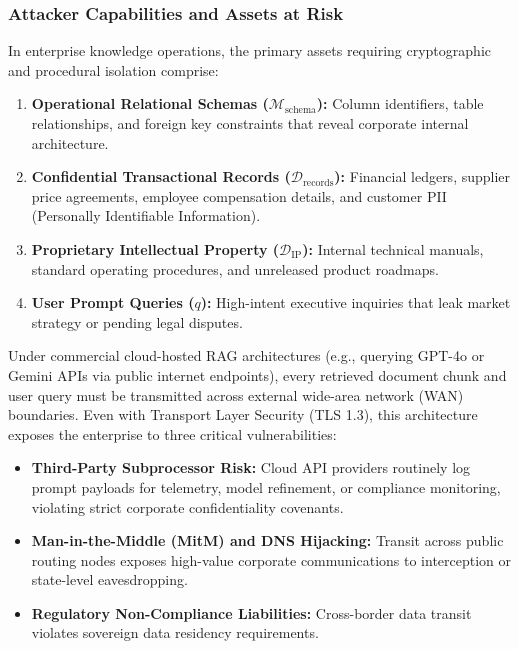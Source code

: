 \subsubsection{Attacker Capabilities and Assets at Risk}
In enterprise knowledge operations, the primary assets requiring cryptographic and procedural isolation comprise:
\begin{enumerate}
    \item \textbf{Operational Relational Schemas ($\mathcal{M}_{\text{schema}}$):} Column identifiers, table relationships, and foreign key constraints that reveal corporate internal architecture.
    \item \textbf{Confidential Transactional Records ($\mathcal{D}_{\text{records}}$):} Financial ledgers, supplier price agreements, employee compensation details, and customer PII (Personally Identifiable Information).
    \item \textbf{Proprietary Intellectual Property ($\mathcal{D}_{\text{IP}}$):} Internal technical manuals, standard operating procedures, and unreleased product roadmaps.
    \item \textbf{User Prompt Queries ($q$):} High-intent executive inquiries that leak market strategy or pending legal disputes.
\end{enumerate}

Under commercial cloud-hosted RAG architectures (e.g., querying GPT-4o or Gemini APIs via public internet endpoints), every retrieved document chunk and user query must be transmitted across external wide-area network (WAN) boundaries. Even with Transport Layer Security (TLS 1.3), this architecture exposes the enterprise to three critical vulnerabilities:
\begin{itemize}
    \item \textbf{Third-Party Subprocessor Risk:} Cloud API providers routinely log prompt payloads for telemetry, model refinement, or compliance monitoring, violating strict corporate confidentiality covenants.
    \item \textbf{Man-in-the-Middle (MitM) and DNS Hijacking:} Transit across public routing nodes exposes high-value corporate communications to interception or state-level eavesdropping.
    \item \textbf{Regulatory Non-Compliance Liabilities:} Cross-border data transit violates sovereign data residency requirements.
\end{itemize}

